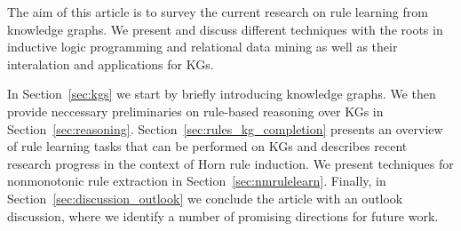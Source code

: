 The aim of this article is to survey the current research on rule learning from knowledge graphs. We present and discuss different techniques with the roots in inductive logic programming and relational data mining as well as their interalation and applications for KGs. 

In Section~\ref{sec:kgs} we start by briefly introducing knowledge graphs. We then provide neccessary preliminaries on rule-based reasoning over KGs in Section~\ref{sec:reasoning}. Section~\ref{sec:rules_kg_completion} presents an overview of rule learning tasks that can be performed on KGs and describes recent research progress in the context of Horn rule induction. We present techniques for nonmonotonic rule extraction in Section~\ref{sec:nmrulelearn}. Finally, in Section~\ref{sec:discussion_outlook} we conclude the article with an outlook discussion, where we identify a number of promising directions for future work.


